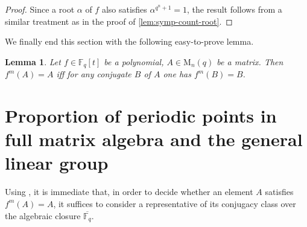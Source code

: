 \documentclass[11pt,twoside]{amsart}
\newcommand{\GL}{\mathrm{GL}}
\newcommand{\M}{\mathrm{M}}
\newcommand{\F}{\mathbb{F}}
\newtheorem{lemma}{Lemma}[section]
\theoremstyle{definition} %
\begin{document}
\begin{proof}
    Since a root $\alpha$ of $f$ also satisfies $\alpha^{q^n+1}=1$, the result follows from a similar treatment as in the proof of \cref{lem:symp-count-root}.
\end{proof}
We finally end this section with the following easy-to-prove lemma.
\begin{lemma}\label{lem:conj}
    Let $f\in \F_q[t]$ be a polynomial, $A\in\M_n(q)$ be a matrix. Then $f^m(A)=A$ iff for any conjugate $B$ of $A$ one has $f^m(B)=B$.
\end{lemma}

\section{Proportion of periodic points in full matrix algebra and the general linear group}\label{sec:gl-m}
Using , it is immediate that, in order to decide whether an element $A$ satisfies $f^m(A)=A$, it suffices to consider a representative of its conjugacy class over the algebraic closure $\overline{\F_q}$.
\end{document}
